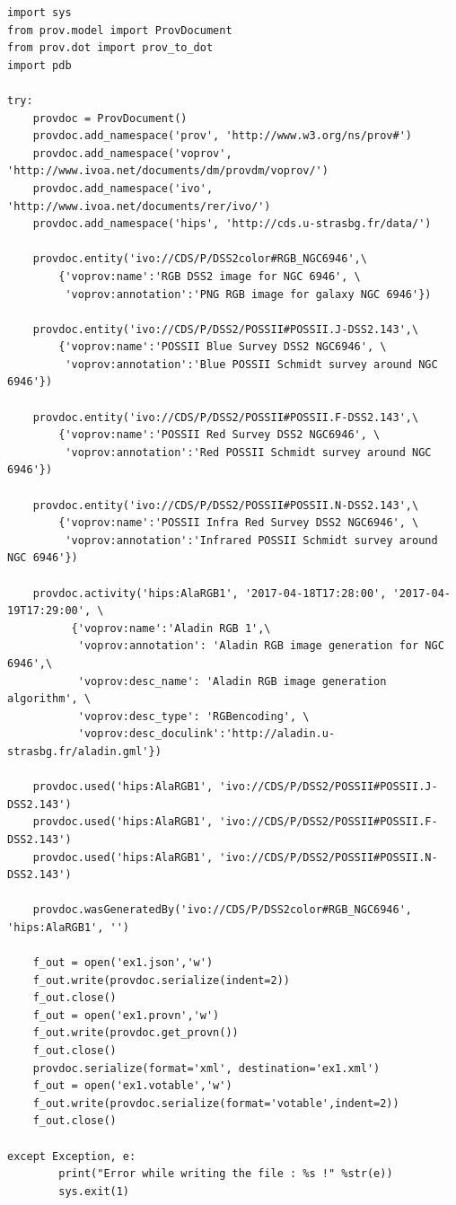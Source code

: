 \begin{verbatim}
import sys
from prov.model import ProvDocument
from prov.dot import prov_to_dot
import pdb

try:
    provdoc = ProvDocument()
    provdoc.add_namespace('prov', 'http://www.w3.org/ns/prov#')
    provdoc.add_namespace('voprov', 'http://www.ivoa.net/documents/dm/provdm/voprov/')
    provdoc.add_namespace('ivo', 'http://www.ivoa.net/documents/rer/ivo/')
    provdoc.add_namespace('hips', 'http://cds.u-strasbg.fr/data/')

    provdoc.entity('ivo://CDS/P/DSS2color#RGB_NGC6946',\
        {'voprov:name':'RGB DSS2 image for NGC 6946', \
         'voprov:annotation':'PNG RGB image for galaxy NGC 6946'})

    provdoc.entity('ivo://CDS/P/DSS2/POSSII#POSSII.J-DSS2.143',\
        {'voprov:name':'POSSII Blue Survey DSS2 NGC6946', \
         'voprov:annotation':'Blue POSSII Schmidt survey around NGC 6946'})

    provdoc.entity('ivo://CDS/P/DSS2/POSSII#POSSII.F-DSS2.143',\
        {'voprov:name':'POSSII Red Survey DSS2 NGC6946', \
         'voprov:annotation':'Red POSSII Schmidt survey around NGC 6946'})

    provdoc.entity('ivo://CDS/P/DSS2/POSSII#POSSII.N-DSS2.143',\
        {'voprov:name':'POSSII Infra Red Survey DSS2 NGC6946', \
         'voprov:annotation':'Infrared POSSII Schmidt survey around NGC 6946'})

    provdoc.activity('hips:AlaRGB1', '2017-04-18T17:28:00', '2017-04-19T17:29:00', \
          {'voprov:name':'Aladin RGB 1',\
           'voprov:annotation': 'Aladin RGB image generation for NGC 6946',\
           'voprov:desc_name': 'Aladin RGB image generation algorithm', \
           'voprov:desc_type': 'RGBencoding', \
           'voprov:desc_doculink':'http://aladin.u-strasbg.fr/aladin.gml'})

    provdoc.used('hips:AlaRGB1', 'ivo://CDS/P/DSS2/POSSII#POSSII.J-DSS2.143')
    provdoc.used('hips:AlaRGB1', 'ivo://CDS/P/DSS2/POSSII#POSSII.F-DSS2.143')
    provdoc.used('hips:AlaRGB1', 'ivo://CDS/P/DSS2/POSSII#POSSII.N-DSS2.143')

    provdoc.wasGeneratedBy('ivo://CDS/P/DSS2color#RGB_NGC6946', 'hips:AlaRGB1', '')

    f_out = open('ex1.json','w')
    f_out.write(provdoc.serialize(indent=2))
    f_out.close()
    f_out = open('ex1.provn','w')
    f_out.write(provdoc.get_provn())
    f_out.close()
    provdoc.serialize(format='xml', destination='ex1.xml')
    f_out = open('ex1.votable','w')
    f_out.write(provdoc.serialize(format='votable',indent=2))
    f_out.close()

except Exception, e:
        print("Error while writing the file : %s !" %str(e))
        sys.exit(1)

\end{verbatim}

